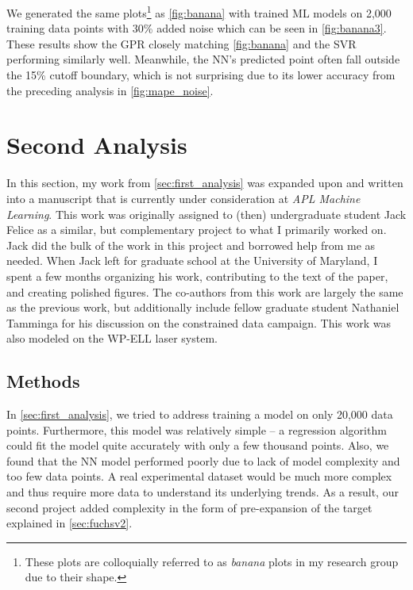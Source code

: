 We generated the same plots\footnote{These plots are colloquially referred to as \emph{banana} plots in my research group due to their shape.} as \autoref{fig:banana} with trained \gls{ML} models on 2,000 training data points with 30\% added noise which can be seen in \autoref{fig:banana3}. These results show the \gls{GPR} closely matching \autoref{fig:banana} and the \gls{SVR} performing similarly well. Meanwhile, the \gls{NN}'s predicted point often fall outside the 15\% cutoff boundary, which is not surprising due to its lower accuracy from the preceding analysis in \autoref{fig:mape_noise}. 

\section{Second Analysis} \label{sec:second_analysis}

In this section, my work from \autoref{sec:first_analysis} was expanded upon and written into a manuscript that is currently under consideration at \emph{APL Machine Learning}. This work was originally assigned to (then) undergraduate student Jack Felice as a similar, but complementary project to what I primarily worked on. Jack did the bulk of the work in this project and borrowed help from me as needed. When Jack left for graduate school at the University of Maryland, I spent a few months organizing his work, contributing to the text of the paper, and creating polished figures. The co-authors from this work are largely the same as the previous work, but additionally include fellow graduate student Nathaniel Tamminga for his discussion on the constrained data campaign. This work was also modeled on the \gls{WP-ELL} laser system.

\subsection{Methods}
In \autoref{sec:first_analysis}, we tried to address training a model on only 20,000 data points. Furthermore, this model was relatively simple -- a regression algorithm could fit the model quite accurately with only a few thousand points. Also, we found that the \gls{NN} model performed poorly due to lack of model complexity and too few data points. A real experimental dataset would be much more complex and thus require more data to understand its underlying trends. As a result, our second project added complexity in the form of pre-expansion of the target explained in \autoref{sec:fuchsv2}. 

